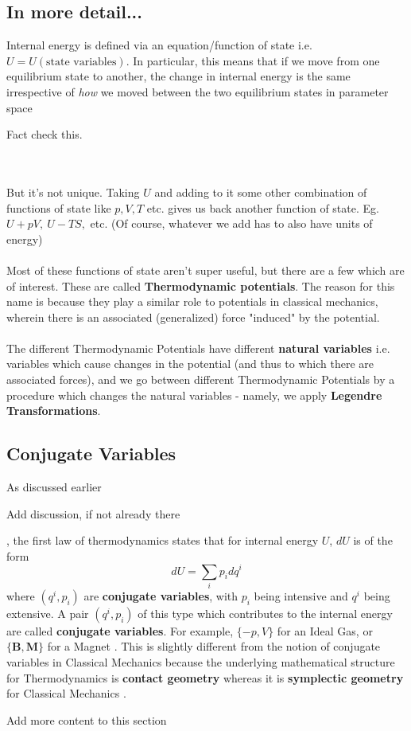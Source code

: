 \documentclass[11pt]{article}
\begin{document}
\subsection{In more detail...}
Internal energy is defined via an equation/function of state i.e. $U = U(\textrm{state variables})$. In particular, this means that if we move from one equilibrium state to another, the change in internal energy is the same irrespective of \emph{how} we moved between the two equilibrium states in parameter space \begin{note} {Fact check this.} \end{note} 
\\
\\
But it's not unique. Taking $U$ and adding to it some other combination of functions of state like $p, V, T$ etc. gives us back another function of state. Eg. $U + pV, ~U-TS,$ etc. (Of course, whatever we add has to also have units of energy)
\\
\\
Most of these functions of state aren't super useful, but there are a few which are of interest. These are called \textbf{Thermodynamic potentials}. The reason for this name is because they play a similar role to potentials in classical mechanics, wherein there is an associated (generalized) force "induced" by the potential.
\\
\\
The different Thermodynamic Potentials have different \textbf{natural variables} i.e. variables which cause changes in the potential (and thus to which there are associated forces), and we go between different Thermodynamic Potentials by a procedure which changes the natural variables - namely, we apply \textbf{Legendre Transformations}.


\subsection{Conjugate Variables}
As discussed earlier \begin{note} {Add discussion, if not already there} \end{note}, the first law of thermodynamics states that for internal energy $U$, $dU$ is of the form $$dU = \sum_{i} p_i dq^i$$ where $(q^i, p_i)$ are \textbf{conjugate variables}, with $p_i$ being intensive and $q^i$ being extensive. A pair $(q^i, p_i)$ of this type which contributes to the internal energy are called \textbf{conjugate variables}. For example, $\{-p, V\}$ for an Ideal Gas, or $\{\mathbf{B}, \mathbf{M}\}$ for a Magnet \cite{Gros17}. This is slightly different from the notion of conjugate variables in Classical Mechanics because the underlying mathematical structure for Thermodynamics is \textbf{contact geometry} whereas it is \textbf{symplectic geometry} for Classical Mechanics \cite{QMechanic17} \cite{Nejati18} \cite{Rajeev07}. \begin{note}
  {Add more content to this section}
\end{note}
\end{document}

